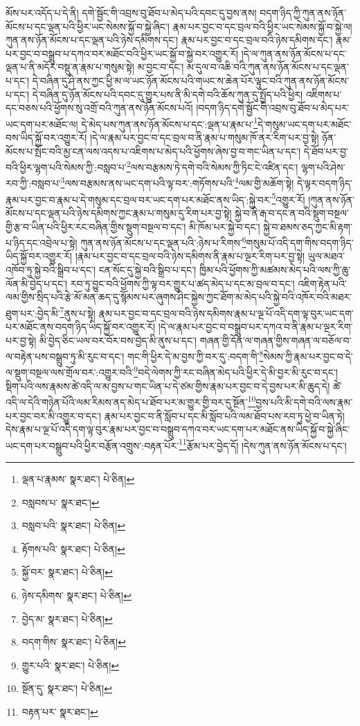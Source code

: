 མོས་པར་འདོད་པ་དེ་ནི། དགེ་སྦྱོང་གི་འབྲས་བུ་ཐོབ་པ་མེད་པའི་དབང་དུ་བྱས་ནས། བདག་ཉིད་ཀྱི་ཀུན་ནས་ཉོན་མོངས་པ་དང་ལྡན་པའི་ཕྱིར་ཡང་སེམས་སྐྱོ་བ་སྐྱེ་ཞིང་། རྣམ་པར་བྱང་བ་དང་བྲལ་བའི་ཕྱིར་ཡང་སེམས་སྐྱོ་བ་སྐྱེ་ལ། ཀུན་ནས་ཉོན་མོངས་པ་དང་ལྡན་པའི་ཉེས་དམིགས་དང་། རྣམ་པར་བྱང་བ་དང་བྲལ་བའི་ཉེས་དམིགས་དང་། རྣམ་པར་བྱང་བ་བསྒྲུབ་པ་དཀའ་བར་མཐོང་བའི་ཕྱིར་ཡང་སྐྱོ་བ་སྐྱེ་བར་འགྱུར་རོ། །དེ་ལ་ཀུན་ནས་ཉོན་མོངས་པ་དང་ལྡན་པ་ནི་མདོར་བསྡུ་ན་རྣམ་པ་གསུམ་སྟེ། མ་བྱང་བ་དང་། མ་དུལ་བ་འཆི་བའི་ཀུན་ནས་ཉོན་མོངས་པ་དང་ལྡན་པ་དང་། དེ་བཞིན་དུ་ཤི་ནས་ཀྱང་ཕྱི་མ་ལ་ཡང་ཉོན་མོངས་པའི་གཡང་ས་ཆེན་པོར་ལྟུང་བའི་ཀུན་ནས་ཉོན་མོངས་པ་དང་། དེ་བཞིན་དུ་ཉོན་མོངས་པའི་དབང་དུ་གྱུར་པས་ནི་མི་དགེ་བའི་ཆོས་ཀུན་དུ་སྤྱོད་པའི་ཕྱིར། འཇིགས་པ་དང་བཅས་པའི་ཕྱོགས་སུ་འགྲོ་བའི་ཀུན་ནས་ཉོན་མོངས་པའོ། །བདག་ཉིད་དགེ་སྦྱོང་གི་འབྲས་བུ་ཐོབ་པ་མེད་པར་ཡང་དག་པར་མཐོང་ལ། དེ་མེད་པས་ཀུན་ནས་ཉོན་མོངས་པ་དང་:ལྡན་པ་རྣམ་པ་\footnote{ལྡན་པ་རྣམས་  སྣར་ཐང་།  པེ་ཅིན། }དེ་གསུམ་ཡང་དག་པར་མཐོང་བས་ཡིད་སྐྱོ་བར་འགྱུར་རོ། །དེ་ལ་རྣམ་པར་བྱང་བ་དང་བྲལ་བ་ནི་རྣམ་པ་གསུམ་ཁོ་ནར་རིག་པར་བྱ་སྟེ། ཉོན་མོངས་པ་སྤོང་བའི་མྱ་ངན་ལས་འདས་པ་འཇིགས་པ་མེད་པའི་ཕྱོགས་ཞེས་བྱ་བ་གང་ཡིན་པ་དང་། དེ་ཐོབ་པར་བྱ་བའི་ཕྱིར་ལྷག་པའི་སེམས་ཀྱི་:བསླབ་པ་\footnote{བསླབས་པ་  སྣར་ཐང་། }ལས་བརྩམས་ཏེ་དགེ་བའི་སེམས་ཀྱི་ཏིང་ངེ་འཛིན་དང་། ལྷག་པའི་ཤེས་རབ་ཀྱི་:བསླབ་པ་\footnote{བསླབ་པའི་  སྣར་ཐང་།  པེ་ཅིན། }ལས་བརྩམས་ནས་ཡང་དག་པའི་ལྟ་བར་:གཏོགས་པའི་\footnote{རྟོགས་པའི་  སྣར་ཐང་།  པེ་ཅིན། }ལམ་གྱི་མཆོག་སྟེ། དེ་ལྟར་བདག་ཉིད་རྣམ་པར་བྱང་བ་རྣམ་པ་དེ་གསུམ་དང་བྲལ་བར་ཡང་དག་པར་མཐོང་ནས་ཡིད་:སྐྱེ་བར་\footnote{སྐྱོ་བར་  སྣར་ཐང་།  པེ་ཅིན། }འགྱུར་རོ། །ཀུན་ནས་ཉོན་མོངས་པ་དང་ལྡན་པའི་ཉེས་དམིགས་ཀྱང་རྣམ་པ་གསུམ་དུ་རིག་པར་བྱ་སྟེ། སྐྱེ་བ་ནི་རྒ་བ་དང་ན་བའི་སྡུག་བསྔལ་གྱི་རྩ་བ་ཡིན་པའི་ཕྱིར་རང་བཞིན་གྱིས་སྡུག་བསྔལ་བ་དང་། མི་ཁོམ་པར་སྐྱེ་བ་དང་། སྐྱེ་བ་ཐམས་ཅད་ཀྱང་མི་རྟག་པ་ཉིད་དང་འབྲེལ་པ་སྟེ། ཀུན་ནས་ཉོན་མོངས་པ་དང་ལྡན་པའི་:ཉེས་པ་རིགས་\footnote{ཉེས་དམིགས་  སྣར་ཐང་།  པེ་ཅིན། }གསུམ་པོ་འདི་དག་གིས་བདག་ཉིད་ཡིད་སྐྱོ་བར་འགྱུར་རོ། །རྣམ་པར་བྱང་བ་དང་བྲལ་བའི་ཉེས་དམིགས་ནི་རྣམ་པ་ལྔར་རིག་པར་བྱ་སྟེ། ཡུལ་མཐའ་འཁོབ་ཏུ་སྐྱེ་བའི་སྒྲིབ་པ་དང་། ངན་སོང་དུ་སྐྱེ་བའི་སྒྲིབ་པ་དང་། ཁྱིམ་པའི་ཕྱོགས་ཀྱི་མཚམས་མེད་པའི་ལས་ཀྱི་ཆུ་ལོན་མི་བྱེད་པ་དང་། རབ་ཏུ་བྱུང་བའི་ཕྱོགས་ཀྱི་ལྟ་བར་གྱུར་པ་ཚད་མེད་པ་དང་མ་བྲལ་བ་དང་། འཇིག་རྟེན་པའི་ལམ་གྱིས་སྲིད་པའི་རྩེ་མོ་མན་ཆད་དུ་སྙོམས་པར་ཞུགས་ཤིང་སྐྱེས་ཀྱང་ཐོག་མ་མེད་པའི་སྐྱེ་བའི་འཁོར་བའི་མཐར་ཐུག་པར་:བྱེད་མི་\footnote{བྱེད་མ་  སྣར་ཐང་།  པེ་ཅིན། }ནུས་པ་སྟེ། རྣམ་པར་བྱང་བ་དང་བྲལ་བའི་ཉེས་དམིགས་རྣམ་པ་ལྔ་པོ་འདི་དག་ལྟ་བུར་ཡང་དག་པར་མཐོང་ནས་བདག་ཉིད་ཡིད་སྐྱོ་བར་འགྱུར་རོ། །དེ་ལ་རྣམ་པར་བྱང་བ་བསྒྲུབ་པར་དཀའ་བ་ནི་རྣམ་པ་ལྔར་རིག་པར་བྱ་སྟེ། མི་བྱེད་ཅིང་ཡལ་བར་བོར་བས་བྱེད་མི་ནུས་པ་དང་། གཞན་གྱི་དོན་ལ་གཞན་གྱིས་གཞན་ལ་བཅོལ་བ་ལ་བརྟེན་པས་བསྒྲུབ་ཏུ་མི་རུང་བ་དང་། གང་གི་ཕྱིར་དེ་མ་བྱས་ཀྱི་བར་དུ་:བདག་གི་\footnote{བདག་གིས་  སྣར་ཐང་།  པེ་ཅིན། }སེམས་ཀྱི་རྣམ་པར་བྱང་བ་དེ་ལ་སྡུག་བསྔལ་ལས་གྲོལ་བར་:འགྱུར་བའི་\footnote{གྱུར་པའི་  སྣར་ཐང་།  པེ་ཅིན། }བདེ་ལེགས་ཀྱི་རང་བཞིན་མེད་པའི་ཕྱིར་དེ་མི་བྱར་མི་རུང་བ་དང་། སྡིག་པའི་ལས་རྣམས་ཚེ་འདི་ལ་མ་བྱས་པ་གང་ཡིན་པ་དེ་ཙམ་གྱིས་རྣམ་པར་བྱང་བ་དེ་བྱས་པར་མི་ཆུད་དེ། ཚེ་འདི་ལ་དེའི་གཉེན་པོའི་ལམ་རིམས་ནད་མེད་པ་ཐོབ་པར་མ་གྱུར་གྱི་བར་དུ་སྔོན་\footnote{སྔོན་དུ་  སྣར་ཐང་།  པེ་ཅིན། }བྱས་པའི་མི་དགེ་བའི་ལས་རྣམ་པར་བྱང་བར་མི་འགྱུར་བ་དང་། རྣམ་པར་བྱང་བ་ནི་སློབ་པ་དང་མི་སློབ་པའི་ལམ་ཐོབ་པས་རབ་ཏུ་ཕྱེ་བ་ཡིན་ཏེ། དེས་རྣམ་པ་ལྔ་པོ་འདི་དག་ལྟ་བུར་རྣམ་པར་བྱང་བ་བསྒྲུབ་དཀའ་བར་ཡང་དག་པར་མཐོང་ནས་ཡིད་སྐྱོ་བ་སྐྱེ་ཞིང་ཡང་དག་པར་བསྒྲུབ་པའི་ཕྱིར་བརྩོན་འགྲུས་:བརྟན་པོར་\footnote{བརྟན་པར་  སྣར་ཐང་། }རྩོམ་པར་བྱེད་དོ། །དེས་ཀུན་ནས་ཉོན་མོངས་པ་དང་། 